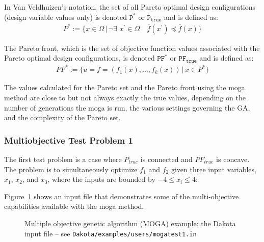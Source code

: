 In Van Veldhuizen's notation, the set of all Pareto optimal design
configurations (design variable values only) is denoted $\mathtt{P^*}$
or $\mathtt{P_{true}}$ and is defined as:
\begin{eqnarray*}
  P^*:=\{x\in\Omega\,|\,\neg\exists\,\,
  x^\prime\in\Omega\quad\bar{f}(x^\prime)\preceq\bar{f}(x)\}
\end{eqnarray*}
 
The Pareto front, which is the set of objective function values
associated with the Pareto optimal design configurations, is denoted
$\mathtt{PF^*}$ or $\mathtt{PF_{true}}$ and is defined as:
\begin{eqnarray*}
  PF^*:=\{\bar{u}=\bar{f}=(f_1(x),\ldots,f_k(x))\,|\, x\in P^*\}
\end{eqnarray*}
 
The values calculated for the Pareto set and the Pareto front using
the moga method are close to but not always exactly the true values,
depending on the number of generations the moga is run, the various
settings governing the GA, and the complexity of the Pareto set.

\subsubsection{Multiobjective Test Problem 1}\label{additional:multiobjective:problem1}
 
The first test problem is a case where $P_{true}$ is connected and
$PF_{true}$ is concave. The problem is to simultaneously optimize
$f_1$ and $f_2$ given three input variables, $x_1$, $x_2$, and
$x_3$, where the inputs are bounded by $-4 \leq x_{i} \leq 4$:
 
Figure~\ref{additional:moga1inp} shows an input file that
demonstrates some of the multi-objective capabilities available with
the moga method.
\begin{figure}[htp!]
  \centering
  \begin{bigbox}
    \begin{small}
    \end{small}
  \end{bigbox}
  \caption{Multiple objective genetic algorithm (MOGA) example: the
    Dakota input file --
see \texttt{Dakota/examples/users/mogatest1.in} }
  \label{additional:moga1inp}
\end{figure}
 
